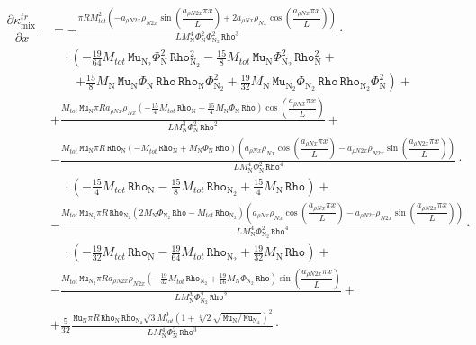 \documentclass[10pt]{article}
\newcommand{\diff}[2] {\dfrac{\partial #1 }{\partial #2}}
\newcommand{\Rho}{\,\mathtt{Rho}}
\newcommand{\N}{\text{N}}
\newcommand{\Mu}{\, \mathtt{Mu}}
\newcommand{\mix}{\text{mix}\,}
\newcommand{\DKappatrDx}{\diff{\kappa^{tr}_{\mix}}{x}\,}
\begin{document}
\begin{equation}
\begin{split}\label{eq:DKappatrDx}
 \DKappatrDx &= 
- \frac{\pi R M_{tot}^{2} \left(- a_{\rho N2 x} \rho_{N2 x} \sin\left(\dfrac{a_{\rho N2 x} \pi x}{L}\right) + 2 a_{\rho N x}
\rho_{N x} \cos\left(\dfrac{a_{\rho N x} \pi x}{L}\right)\right) }{L M_{\N}^{4} \Phi_{\N}^{2} \Phi_{\N_2}^{2} \Rho^{3}} \cdot\\
 &\quad \cdot \left(- \frac{19}{64} M_{tot} \Mu_{\N_2} \Phi_{\N}^{2} \Rho_{\N_2}^{2} - \frac{15}{8} M_{tot} \Mu_{\N}
\Phi_{\N_2}^{2} \Rho_{\N}^{2}\right.+\\ 
	&\quad\quad \left. + \frac{15}{8} M_{\N} \Mu_{\N} \Phi_{\N} \Rho \Rho_{\N} \Phi_{\N_2}^{2} + \frac{19}{32} M_{\N} \Mu_{\N_2}
\Phi_{\N_2} \Rho \Rho_{\N_2} \Phi_{\N}^{2}\right)+\\ 
%
&+ \frac{M_{tot} \Mu_{\N} \pi R a_{\rho N x} \rho_{N x} \left(- \frac{15}{4} M_{tot} \Rho_{\N} + \frac{15}{4} M_{\N} \Phi_{\N}
\Rho\right) \cos\left(\dfrac{a_{\rho N x} \pi x}{L}\right)}{L M_{\N}^{3} \Phi_{\N}^{2} \Rho^{2}} +\\ 
%
&- \frac{M_{tot} \Mu_{\N} \pi R \Rho_{\N} \left(- M_{tot} \Rho_{\N} + M_{\N} \Phi_{\N} \Rho\right) \left(a_{\rho N x} \rho_{N x}
\cos\left(\dfrac{a_{\rho N x} \pi x}{L}\right) - a_{\rho N2 x} \rho_{N2 x} \sin\left(\dfrac{a_{\rho N2 x} \pi x}{L}\right)\right)
}{L M_{\N}^{4} \Phi_{\N}^{2} \Rho^{4}} \cdot\\
 &\quad \cdot \left(- \frac{15}{4} M_{tot} \Rho_{\N} - \frac{15}{8} M_{tot} \Rho_{\N_2} + \frac{15}{4} M_{\N} \Rho\right) +\\ 
%
&- \frac{M_{tot} \Mu_{\N_2} \pi R \Rho_{\N_2} \left(2 M_{\N} \Phi_{\N_2} \Rho - M_{tot} \Rho_{\N_2} \right) \left(a_{\rho N x}
\rho_{N x} \cos\left(\dfrac{a_{\rho N x} \pi x}{L}\right) - a_{\rho N2 x} \rho_{N2 x} \sin\left(\dfrac{a_{\rho N2 x} \pi
x}{L}\right)\right)}{L M_{\N}^{4} \Phi_{\N_2}^{2} \Rho^{4}} \cdot\\
 &\quad \cdot \left(- \frac{19}{32} M_{tot} \Rho_{\N} - \frac{19}{64} M_{tot} \Rho_{\N_2} + \frac{19}{32} M_{\N} \Rho\right) +\\ 
%
&- \frac{M_{tot} \Mu_{\N_2} \pi R a_{\rho N2 x} \rho_{N2 x} \left(- \frac{19}{32} M_{tot} \Rho_{\N_2} + \frac{19}{16} M_{\N}
\Phi_{\N_2} \Rho\right) \sin\left(\dfrac{a_{\rho N2 x} \pi x}{L}\right)}{L M_{\N}^{3} \Phi_{\N_2}^{2} \Rho^{2}} +\\ 
%
&+ \frac{5}{32} \frac{\Mu_{\N} \pi R \Rho_{\N} \Rho_{\N_2} \sqrt{3} M_{tot}^{3} \left(1 + \sqrt[4]{2} \sqrt{ \Mu_{\N} / \Mu_{\N_2}
}\right)^{2} }{L M_{\N}^{4} \Phi_{\N}^{2} \Rho^{3}} \cdot\\

\end{split}
\end{equation}
\end{document}
